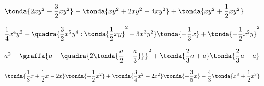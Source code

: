 \begin{esercizio}[*]
\begin{enumeratea}
\(\tonda{2xy^{2}-\dfrac{3}{2}xy^{2}}-\tonda{xy^{2}+2xy^{2}-4xy^{2}
}+\tonda{xy^{2}+\dfrac{1}{2}xy^{2}}\)
\item 
\(\dfrac{1}{4}x^{4}y^{2}-
\quadra{\dfrac{3}{2}x^{5}y^{4}:\tonda{\dfrac{1}{2}xy}^{2}-3x^{3}y^{2}}
\tonda{-{\dfrac{1}{3}}x} +
\tonda{-{\dfrac{1}{2}}x^{2}y}^{2}\)
\item 
\(a^{2}-\graffa{a-\quadra{2\tonda{\dfrac{a}{2}-\dfrac{a}{3}}}}^{2} +
\tonda{\dfrac{2}{3}a+a}\tonda{\dfrac{2}{3}a-a}\)
% 
% 
%  
%  
% 
%  
% 
%  
% 
% 
% 
% 
% 
\item 
\(\tonda{\dfrac{1}{3}x+\dfrac{1}{2}x-2x}\tonda{-{\dfrac{1}{2}x^{2}}}+
\tonda{\dfrac{3}{4}x^{2}-2x^{2}}\tonda{-{\dfrac{3}{5}x}}%
-\dfrac{4}{3}\tonda{x^{3}+\dfrac{1}{2}x^{3}}\)

\end{enumeratea}
\end{esercizio}
